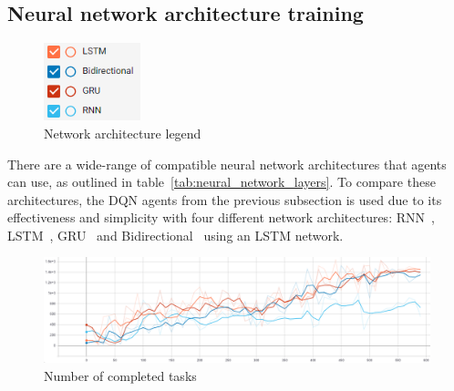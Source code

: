 
\subsection{Neural network architecture training}\label{subsec:neural-network-architecture-training}
\begin{figure}
    \includegraphics[width=0.25\textwidth]{figures/5_evaluation_figs/net_arch_training_fig/legend.png}
    \caption{Network architecture legend}
    \label{fig:net-arch-training-legend}
\end{figure}

There are a wide-range of compatible neural network architectures that agents can use, as outlined in
table~\ref{tab:neural_network_layers}. To compare these architectures, the DQN agents from the previous subsection is
used due to its effectiveness and simplicity with four different network architectures: RNN~\citep{RNN},
LSTM~\citep{LSTM}, GRU~\citep{GRU} and Bidirectional~\citep{Bidirectional} using an LSTM network. \\

\begin{figure}[H]
    \centering
    \includegraphics[width=\linewidth]{figures/5_evaluation_figs/net_arch_training_fig/num_completed_tasks.PNG}
    \caption{Number of completed tasks}
    \label{fig:net_arch_num_completed_tasks}
\end{figure}

